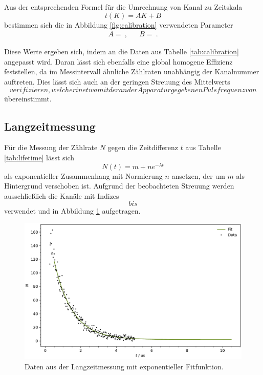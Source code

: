 Aus der entsprechenden Formel für die Umrechnung von Kanal zu Zeitskala
\begin{equation*}
	t(K) = AK + B
\end{equation*}
bestimmen sich die in Abbildung \ref{fig:calibration} verwendeten Parameter
\begin{align*}
	A =  \: , && B =  \: .
\end{align*}

Diese Werte ergeben sich, indem an die Daten aus Tabelle \ref{tab:calibration} angepasst wird. Daran lässt sich ebenfalls
eine global homogene Effizienz feststellen, da im Messintervall ähnliche Zählraten unabhängig der Kanalnummer auftreten.
Dies lässt sich auch an der geringen Streuung des Mittelwerts $$ verifizieren, welcher in etwa mit
der an der Apparatur gegebenen Pulsfrequenz von $$ übereinstimmt.



\subsection{Langzeitmessung}

Für die Messung der Zählrate $N$ gegen die Zeitdifferenz $t$ aus Tabelle \ref{tab:lifetime} lässt sich
\begin{equation*}
	N(t) = m + ne^{-\lambda t}
\end{equation*}
als exponentieller Zusammenhang mit Normierung $n$ ansetzen, der um $m$ als Hintergrund verschoben ist. Aufgrund der
beobachteten Streuung werden ausschließlich die Kanäle mit Indizes $$ bis $$
verwendet und in Abbildung \ref{fig:lifetime} aufgetragen.

\begin{figure}[H]
	\centering
	\includegraphics[width=\textwidth]{build/lifetime.pdf}
	\caption{Daten aus der Langzeitmessung mit exponentieller Fitfunktion.}
	\label{fig:lifetime}
\end{figure}

